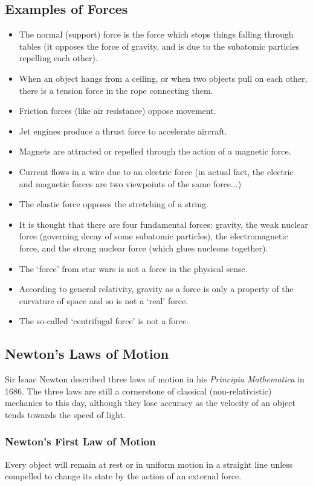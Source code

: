\documentclass[a4paper]{amsbook}
\begin{document}
\subsection{Examples of Forces}
\begin{itemize}
  \item The normal (support) force is the force which stops things falling through tables (it opposes the force of gravity, and is due to
        the subatomic particles repelling each other).
  \item When an object hangs from a ceiling, or when two objects pull on each other, there is a tension force in the rope connecting them.
  \item Friction forces (like air resistance) oppose movement.
  \item Jet engines produce a thrust force to accelerate aircraft.
  \item Magnets are attracted or repelled through the action of a magnetic force.
  \item Current flows in a wire due to an electric force (in actual fact, the electric and magnetic forces are two viewpoints of the same force...)
  \item The elastic force opposes the stretching of a string.
  \item It is thought that there are four fundamental forces: gravity, the weak nuclear force (governing decay of some subatomic particles),
        the electromagnetic force, and the strong nuclear force (which glues nucleons together).
  \item The `force' from star wars is not a force in the physical sense.
  \item According to general relativity, gravity as a force is only a property of the curvature of space and so is not a `real' force.
  \item The so-called `centrifugal force' is not a force.
\end{itemize}

\subsection{Newton's Laws of Motion}
Sir Isaac Newton described three laws of motion in his \textit{Principia Mathematica} in 1686. The three laws are still a cornerstone
of classical (non-relativistic) mechanics to this day, although they lose accuracy as the velocity of an object tends towards the speed
of light.

\subsubsection{Newton's First Law of Motion} Every object will remain at rest or in uniform motion in a straight line unless compelled
to change its state by the action of an external force.
\end{document}
